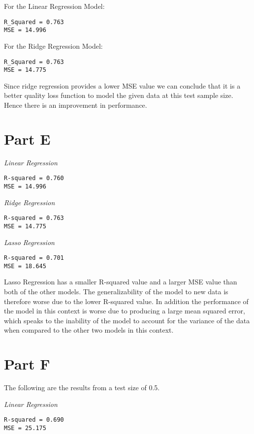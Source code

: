 \documentclass[11pt]{diazessay} %
\begin{document}
For the Linear Regression Model:
\begin{lstlisting}
R_Squared = 0.763
MSE = 14.996
\end{lstlisting}

For the Ridge Regression Model:

\begin{lstlisting}
R_Squared = 0.763
MSE = 14.775
\end{lstlisting}

Since ridge regression provides a lower MSE value we can conclude that it is a better quality loss function to model the given data at this test sample size. Hence there is an improvement in performance.

\section*{Part E}

\textit{Linear Regression }
\begin{lstlisting}
R-squared = 0.760
MSE = 14.996
\end{lstlisting}


\textit{Ridge Regression }
\begin{lstlisting}
R-squared = 0.763
MSE = 14.775
\end{lstlisting}

\textit{Lasso Regression }
\begin{lstlisting}
R-squared = 0.701
MSE = 18.645
\end{lstlisting}

Lasso Regression has a smaller R-squared value and a larger MSE value than both of the other models. The generalizability of the model to new data is therefore worse due to the lower R-squared value. In addition the performance of the model in this context is worse due to producing a large mean squared error, which speaks to the inability of the model to account for the variance of the data when compared to the other two models in this context. 

\section*{Part F}

The following are the results from a test size of 0.5. 

\textit{Linear Regression }
\begin{lstlisting}
R-squared = 0.690
MSE = 25.175
\end{lstlisting}
\end{document}
